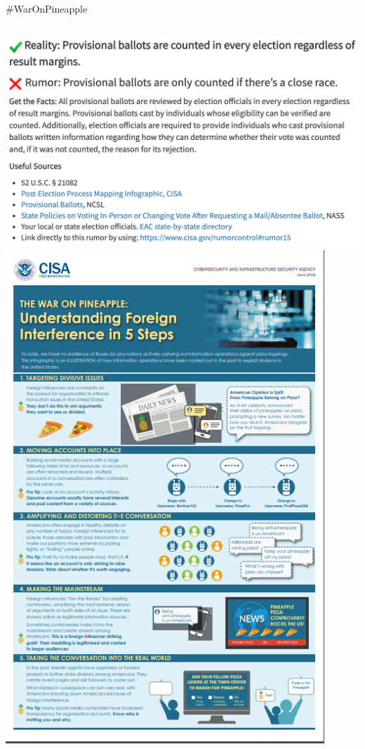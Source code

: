 \documentclass[nobackground,dvipsnames,table,aspectratio=169]{beamer}
\begin{document}
\begin{frame}{\#WarOnPineapple}
    \begin{columns}
            \includegraphics[width=\textwidth]{waronpineapple-3}
            \includegraphics[width=0.9\textwidth]{waronpineapple-4}
    \end{columns}
\end{frame}
\end{document}

